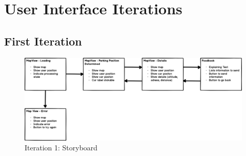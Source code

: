 \chapter{User Interface Iterations}
\label{appendix:userInterface}

\section{First Iteration}
\begin{figure}[H]
    \centering
    \includegraphics[width=\textwidth]{images/UI/Iteration1-Overview.png}
    \caption{Iteration 1: Storyboard}
    \label{fig:i1story}
\end{figure}


